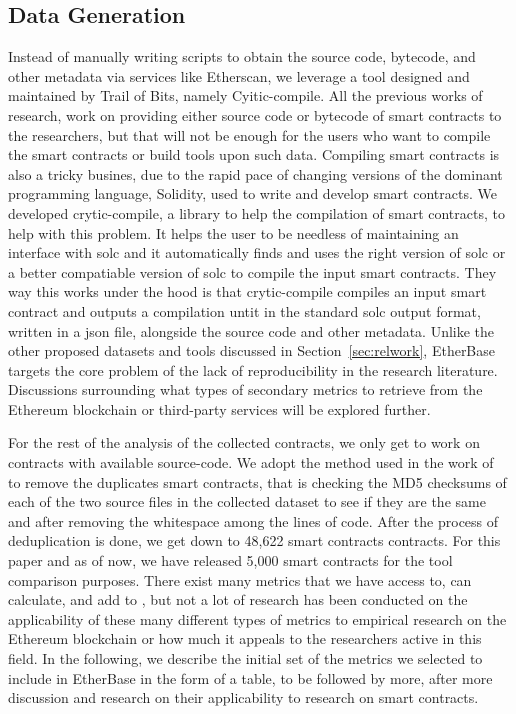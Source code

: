 	\subsection{Data Generation}
		Instead of manually writing scripts to obtain the source code, bytecode, and other metadata via services like Etherscan, we leverage a tool designed and maintained by Trail of Bits, namely Cyitic-compile.
		All the previous works of research, work on providing either source code or bytecode of smart contracts to the researchers, but that will not be enough for the users who want to compile the smart contracts or build tools upon such data.
		Compiling smart contracts is also a tricky busines, due to the rapid pace of changing versions of the dominant programming language, Solidity, used to write and develop smart contracts.
		We developed crytic-compile, a library to help the compilation of smart contracts, to help with this problem.
		It helps the user to be needless of maintaining an interface with solc and it automatically finds and uses the right version of solc or a better compatiable version of solc to compile the input smart contracts.
		They way this works under the hood is that crytic-compile compiles an input smart contract and outputs a compilation untit in the standard solc output format, written in a json file, alongside the source code and other metadata.
		Unlike the other proposed datasets and tools discussed in Section~\ref{sec:relwork}, EtherBase targets the core problem of the lack of reproducibility in the research literature.
		Discussions surrounding what types of secondary metrics to retrieve from the Ethereum blockchain or third-party services will be explored further.
		
		For the rest of the analysis of the collected contracts, we only get to work on contracts with available source-code.
		We adopt the method used in the work of ~\cite{deduplicate} to remove the duplicates smart contracts,
		that is checking the MD5 checksums of each of the two source files in the collected dataset to see if they are the same and after removing the whitespace among the lines of code.
		After the process of deduplication is done, we get down to 48,622 smart contracts contracts.
		For this paper and as of now, we have released 5,000 smart contracts for the tool comparison purposes.
		There exist many metrics that we have access to, can calculate, and add to \etherbase, but not a lot of research has been conducted on the applicability
		of these many different types of metrics to empirical research on the Ethereum blockchain or how much it appeals to the researchers active in this field.
		In the following, we describe the initial set of the metrics we selected to include in EtherBase in the form of a table, to be followed by more,
		after more discussion and research on their applicability to research on smart contracts.

